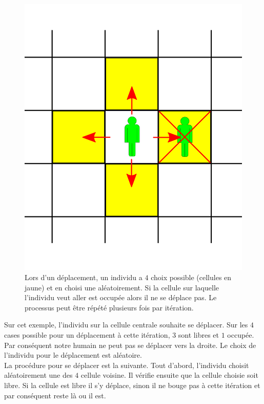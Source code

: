 \begin{figure}[h]
	\centering
	\captionsetup{justification=centering}
	\includegraphics[scale=0.5]{Images/move_available.png}
	\caption[Mouvements des individus]{Lors d'un déplacement, un individu a $4$ choix possible (cellules en jaune) et en choisi une aléatoirement. Si la cellule sur laquelle l'individu veut aller est occupée alors il ne se déplace pas. Le processus peut être répété plusieurs fois par itération.}
\end{figure}

Sur cet exemple, l'individu sur la cellule centrale souhaite se déplacer. Sur les $4$ cases possible pour un déplacement à cette itération, $3$ sont libres et $1$ occupée. Par conséquent notre humain ne peut pas se déplacer vers la droite. Le choix de l'individu pour le déplacement est aléatoire.\\

La procédure pour se déplacer est la suivante. Tout d'abord, l'individu choisit aléatoirement une des $4$ cellule voisine. Il vérifie ensuite que la cellule choisie soit libre. Si la cellule est libre il s'y déplace, sinon il ne bouge pas à cette itération et par conséquent reste là ou il est.

